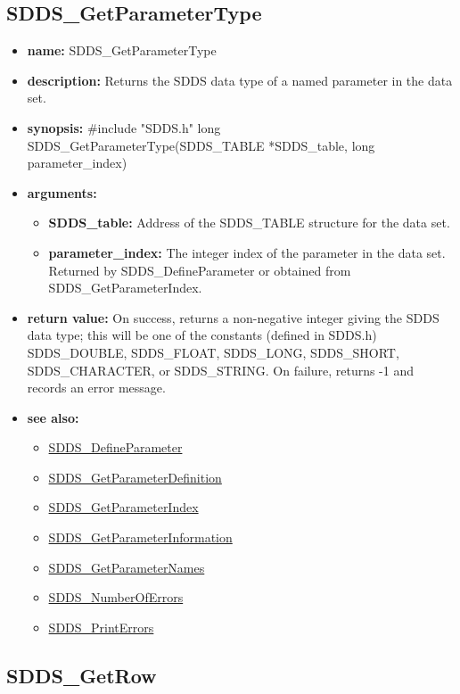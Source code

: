 \documentclass[11pt]{article}
\newcommand{\progref}[1]{\hyperref{SDDS_#1}{{\tt SDDS\_#1} (}{)}{SDDS_#1}}
\begin{document}
\subsection{SDDS\_GetParameterType}
\label{SDDS_GetParameterType}

\begin{itemize}
\item {\bf name:}\newline
SDDS\_GetParameterType
\item {\bf description:}\newline
Returns the SDDS data type of a named parameter in the data set.
\item {\bf synopsis:} \#include "SDDS.h"\newline
long SDDS\_GetParameterType(SDDS\_TABLE *SDDS\_table, long parameter\_index)
\item {\bf arguments:}
\begin{itemize}
\item {\bf SDDS\_table:} Address of the SDDS\_TABLE structure for the data set.
\item {\bf parameter\_index:} The integer index of the parameter in the data set. Returned by SDDS\_DefineParameter or obtained from SDDS\_GetParameterIndex.
\end{itemize}
\item {\bf return value:}\newline
On success, returns a non-negative integer giving the SDDS data type; this will be one of the constants (defined in SDDS.h) SDDS\_DOUBLE, SDDS\_FLOAT, SDDS\_LONG, SDDS\_SHORT, SDDS\_CHARACTER, or SDDS\_STRING. On failure, returns -1 and records an error message.
\item {\bf see also:}
\begin{itemize}
\item \progref{DefineParameter}
\item \progref{GetParameterDefinition}
\item \progref{GetParameterIndex}
\item \progref{GetParameterInformation}
\item \progref{GetParameterNames}
\item \progref{NumberOfErrors}
\item \progref{PrintErrors}
\end{itemize}
\end{itemize}

\subsection{SDDS\_GetRow}
\label{SDDS_GetRow}
\end{document}
